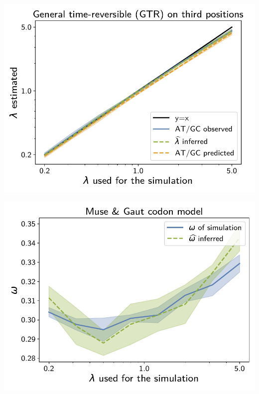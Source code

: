 \documentclass{article}
\begin{document}
\begin{center}
\begin{minipage}{0.325\linewidth}
    \end{minipage}
    \hfill
    \begin{minipage}{0.325\linewidth}
        \includegraphics[width=\linewidth, page=1]{inference_supp_mat/PrimatesExons5Mu1.0_lambda_GTR.pdf}
    \end{minipage}
    \hfill
    \begin{minipage}{0.325\linewidth}
        \includegraphics[width=\linewidth, page=1]{inference_supp_mat/PrimatesExons5Mu1.0_omega_MG.pdf}
    \end{minipage}

\end{center}
\end{document}
